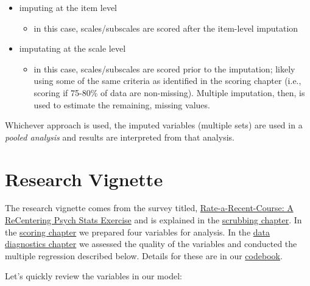 \documentclass[
]{book}
\providecommand{\tightlist}{%
  \setlength{\itemsep}{0pt}\setlength{\parskip}{0pt}}
\begin{document}
\begin{itemize}
\tightlist
\item
  imputing at the item level

  \begin{itemize}
  \tightlist
  \item
    in this case, scales/subscales are scored after the item-level imputation
  \end{itemize}
\item
  imputating at the scale level

  \begin{itemize}
  \tightlist
  \item
    in this case, scales/subscales are scored prior to the imputation; likely using some of the same criteria as identified in the scoring chapter (i.e., scoring if 75-80\% of data are non-missing). Multiple imputation, then, is used to estimate the remaining, missing values.
  \end{itemize}
\end{itemize}

Whichever approach is used, the imputed variables (multiple sets) are used in a \emph{pooled analysis} and results are interpreted from that analysis.

\hypertarget{research-vignette-3}{%
\section{Research Vignette}\label{research-vignette-3}}

The research vignette comes from the survey titled, \href{https://spupsych.az1.qualtrics.com/jfe/form/SV_b2cClqAlLGQ6nLU}{Rate-a-Recent-Course: A ReCentering Psych Stats Exercise} and is explained in the \protect\hyperlink{scrub}{scrubbing chapter}. In the \protect\hyperlink{score}{scoring chapter} we prepared four variables for analysis. In the \protect\hyperlink{DataDx}{data diagnostics chapter} we assessed the quality of the variables and conducted the multiple regression described below. Details for these are in our \href{./Rate-a-Course_Codebook.pdf}{codebook}.

Let's quickly review the variables in our model:
\end{document}
